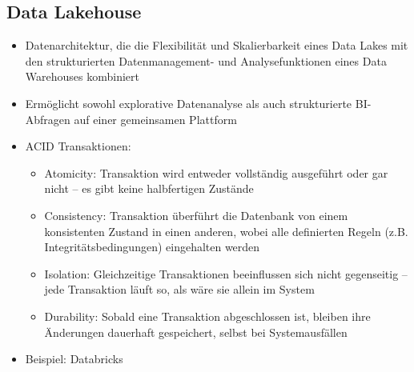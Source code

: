\documentclass[11pt]{scrartcl}
\begin{document}
\subsection{Data Lakehouse}
\begin{itemize}
	\item Datenarchitektur, die die Flexibilität und Skalierbarkeit eines Data Lakes mit den strukturierten Datenmanagement- und Analysefunktionen eines Data Warehouses kombiniert
	\item Ermöglicht sowohl explorative Datenanalyse als auch strukturierte BI-Abfragen auf einer gemeinsamen Plattform
	\item ACID Transaktionen:
	\begin{itemize}
		\item Atomicity: Transaktion wird entweder vollständig ausgeführt oder gar nicht – es gibt keine halbfertigen Zustände
		\item Consistency: Transaktion überführt die Datenbank von einem konsistenten Zustand in einen anderen, wobei alle definierten Regeln (z.B. Integritätsbedingungen) eingehalten werden
		\item Isolation: Gleichzeitige Transaktionen beeinflussen sich nicht gegenseitig – jede Transaktion läuft so, als wäre sie allein im System
		\item Durability: Sobald eine Transaktion abgeschlossen ist, bleiben ihre Änderungen dauerhaft gespeichert, selbst bei Systemausfällen
	\end{itemize}
	\item Beispiel: Databricks
\end{itemize}
\end{document}

